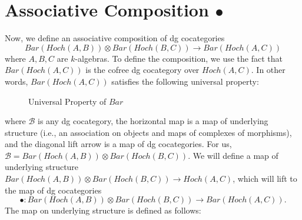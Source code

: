 \section{Associative Composition $\bullet$} \label{sec:assoc_comp}
Now, we define an associative composition of 
dg cocategories 
$$Bar(Hoch(A,B)) \otimes Bar(Hoch(B,C))
\to Bar(Hoch(A,C))$$
where $A,B,C$ are $k$-algebras. To define 
the composition, we use the fact that 
$Bar(Hoch(A,C))$ is the cofree dg 
cocategory over $Hoch(A,C)$. In other 
words, $Bar(Hoch(A,C))$ satisfies 
the following universal property:
%
\begin{figure}[H]
\centerline{}
\caption{Universal Property of $Bar$}	
\end{figure}  
where $\mathcal{B}$ is any dg cocategory, 
the horizontal map is a map of underlying 
structure (i.e., an association on objects 
and maps of complexes of morphisms), and the 
diagonal lift arrow is a map of dg cocategories. 
For us, $\mathcal{B} = Bar(Hoch(A,B)) 
\otimes Bar(Hoch(B,C))$. We will define a map of 
underlying structure $Bar(Hoch(A,B)) \otimes 
Bar(Hoch(B,C)) \to Hoch(A,C)$, which will lift 
to the map of dg cocategories 
$$\bullet: Bar(Hoch(A,B)) \otimes 
Bar(Hoch(B,C)) \to Bar(Hoch(A,C)).$$
The map on underlying structure is defined 
as follows:
%
